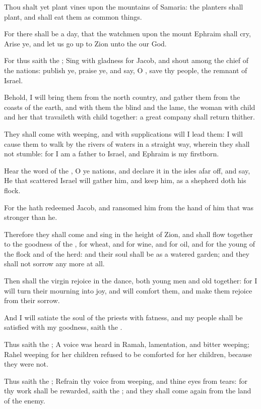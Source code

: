 \Verse Thou shalt yet plant vines upon the mountains of Samaria: the planters shall plant, and shall eat them as common things.

\Verse For there shall be a day, that the watchmen upon the mount Ephraim shall cry, Arise ye, and let us go up to Zion unto the \LORD our God.

\Verse For thus saith the \LORD; Sing with gladness for Jacob, and shout among the chief of the nations: publish ye, praise ye, and say, O \LORD, save thy people, the remnant of Israel.

\Verse Behold, I will bring them from the north country, and gather them from the coasts of the earth, and with them the blind and the lame, the woman with child and her that travaileth with child together: a great company shall return thither.

\Verse They shall come with weeping, and with supplications will I lead them: I will cause them to walk by the rivers of waters in a straight way, wherein they shall not stumble: for I am a father to Israel, and Ephraim is my firstborn.

\Verse Hear the word of the \LORD, O ye nations, and declare it in the isles afar off, and say, He that scattered Israel will gather him, and keep him, as a shepherd doth his flock.

\Verse For the \LORD hath redeemed Jacob, and ransomed him from the hand of him that was stronger than he.

\Verse Therefore they shall come and sing in the height of Zion, and shall flow together to the goodness of the \LORD, for wheat, and for wine, and for oil, and for the young of the flock and of the herd: and their soul shall be as a watered garden; and they shall not sorrow any more at all.

\Verse Then shall the virgin rejoice in the dance, both young men and old together: for I will turn their mourning into joy, and will comfort them, and make them rejoice from their sorrow.

\Verse And I will satiate the soul of the priests with fatness, and my people shall be satisfied with my goodness, saith the \LORD.

\Verse Thus saith the \LORD; A voice was heard in Ramah, lamentation, and bitter weeping; Rahel weeping for her children refused to be comforted for her children, because they were not.

\Verse Thus saith the \LORD; Refrain thy voice from weeping, and thine eyes from tears: for thy work shall be rewarded, saith the \LORD; and they shall come again from the land of the enemy.

